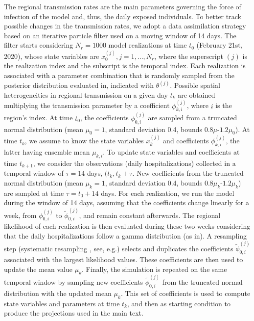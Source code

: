 The regional transmission rates are the main parameters governing the force of infection of the model and, thus, the daily exposed individuals. To better track possible changes in the transmission rates, we adopt a data assimilation strategy based on an iterative particle filter\cite{Manoli:IterativeParticleFilter:2015} used on a moving window of 14 days. The filter starts considering $N_r=1000$ model realizations at time $t_0$ (February 21st, 2020), whose state variables are $x_0^{(j)}, j=1,\dots, N_r$, where the superscript $(j)$ is the realization index and the subscript is the temporal index. Each realization is associated with a parameter combination that is randomly sampled from the posterior distribution evaluated in\cite{Bertuzzo:GeographyCOVID19Spread:2020}, indicated with $\theta^{(j)}$. Possible spatial heterogeneities in regional transmission on a given day $t_k$ are obtained multiplying the transmission parameter by a coefficient $\phi_{k,i}^{(j)}$, where $i$ is the region's index. At time $t_0$, the coefficients $\phi_{0,i}^{(j)}$ are sampled from a truncated normal distribution (mean $\mu_0=1$, standard deviation 0.4, bounds $0.8\mu$-$1.2\mu_0$).
At time $t_k$, we assume to know the state variables $x_k^{(j)}$ and coefficients $\phi_{k,i}^{(j)}$, the latter having ensemble mean $\mu_{k,i}$. To update state variables and coefficients at time $t_{k+1}$, we consider the observations (daily hospitalizations) collected in a temporal window of $\tau=14$ days, $(t_k,t_{k}+\tau$. New coefficients from the truncated normal distribution (mean $\mu_k=1$, standard deviation 0.4, bounds $0.8\mu_k$-$1.2\mu_k$) are sampled at time $\tau=t_0+14$ days.  For each realization, we run the model during the window of 14 days, assuming that the coefficients change linearly for a week, from  $\phi_{0,i}^{(j)}$ to $\tilde{\phi}_{0,i}^{(j)}$, and remain constant afterwards.
The regional likelihood of each realization is then evaluated during these two weeks considering that the daily hospitalizations follow a gamma distribution (as in\cite{Bertuzzo:GeographyCOVID19Spread:2020}). 
A resampling step (systematic resampling , see, e.g.\cite{Douc:ComparisonResamplingSchemes:2005}) selects and duplicates the coefficients $\tilde{\phi}_{0,i}^{(j)}$ associated with the largest likelihood values. These coefficients are then used to update the mean value $\mu_k$. Finally, the simulation is repeated on the same temporal window by sampling new coefficients $\tilde{\phi}_{0,i}^{(j)}$ from the truncated normal distribution with the updated mean $\mu_k$. This set of coefficients is used to compute state variables and parameters at time $t_k$, and then as starting condition to produce the projections used in the main text.

